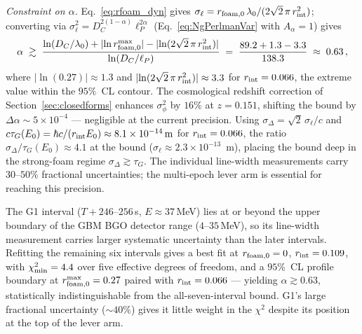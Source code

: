 \documentclass[aps,prd,onecolumn,amsmath,amssymb]{revtex4-2}
\begin{document}
\textit{Constraint on $\alpha$.}
Eq.~\eqref{eq:rfoam_dyn} gives
$\sigma_\ell = r_{\rm foam,0}\,\lambda_0/(2\sqrt{2}\,\pi\,r_{\rm int}^2)$;
converting via $\sigma_\ell^2 = D_C^{2(1-\alpha)}\ell_P^{2\alpha}$
(Eq.~\eqref{eq:NgPerlmanVar} with $A_\alpha=1$) gives
\begin{equation}
  \alpha \;\gtrsim\;
  \frac{\ln(D_C/\lambda_0) + |\!\ln r_{\rm foam,0}^{\rm max}|
        - |\!\ln(2\sqrt{2}\,\pi\,r_{\rm int}^2)|}
       {\ln(D_C/\ell_P)}
  \;=\; \frac{89.2 + 1.3 - 3.3}{138.3}
  \;\approx\; 0.63\,,
  \label{eq:alpha_grb_dyn}
\end{equation}
where $|\!\ln(0.27)|\approx1.3$ and
$|\!\ln(2\sqrt{2}\,\pi\,r_{\rm int}^2)|\approx 3.3$ for
$r_{\rm int}=0.066$, the extreme value within the $95\%$~CL
contour.
The cosmological redshift correction of Section~\ref{sec:closedforms}
enhances $\sigma_\phi^2$ by $16\%$ at $z=0.151$, shifting the bound
by $\Delta\alpha\sim 5\times10^{-4}$ --- negligible at the current
precision.
Using $\sigma_\Delta=\sqrt{2}\,\sigma_\ell/c$ and
$c\tau_G(E_0)=\hbar c/(r_{\rm int}E_0)\approx 8.1\times10^{-14}\,\mathrm{m}$
for $r_{\rm int}=0.066$, the ratio $\sigma_\Delta/\tau_G(E_0)\approx 4.1$
at the bound ($\sigma_\ell\approx 2.3\times 10^{-13}$~m), placing
the bound deep in the strong-foam regime $\sigma_\Delta\gtrsim\tau_G$.
The individual line-width measurements carry $30$--$50\%$ fractional
uncertainties; the multi-epoch lever arm is essential for reaching
this precision.

The G1 interval ($T+246$--$256$\,s, $E\approx37$\,MeV) lies at or
beyond the upper boundary of the GBM BGO detector range
($4$--$35$\,MeV), so its line-width measurement carries larger
systematic uncertainty than the later intervals.  Refitting the
remaining six intervals gives a best fit at $r_{\rm foam,0}=0$,
$r_{\rm int}=0.109$, with $\chi^2_{\rm min}=4.4$ over five effective
degrees of freedom, and a $95\%$~CL profile boundary at
$r_{\rm foam,0}^{\rm max}=0.27$ paired with $r_{\rm int}=0.066$ ---
yielding $\alpha\gtrsim 0.63$, statistically indistinguishable from
the all-seven-interval bound.  G1's large fractional uncertainty
($\sim 40\%$) gives it little weight in the $\chi^2$ despite its
position at the top of the lever arm.
\end{document}
